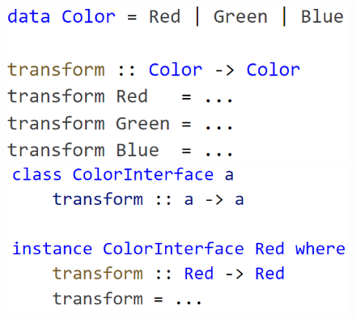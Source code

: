 \documentclass{article}
\begin{document}
\begin{figure}[ht]
    \centering
    \begin{minipage}{.5\textwidth}
        \hspace{1em}
        \includegraphics[scale=0.4]{CodeType16.png}
    \end{minipage}%
    \begin{minipage}{.5\textwidth}
        \hspace{1em}
        \includegraphics[scale=0.4]{CodeType17.png}
    \end{minipage}
\end{figure}
\end{document}
